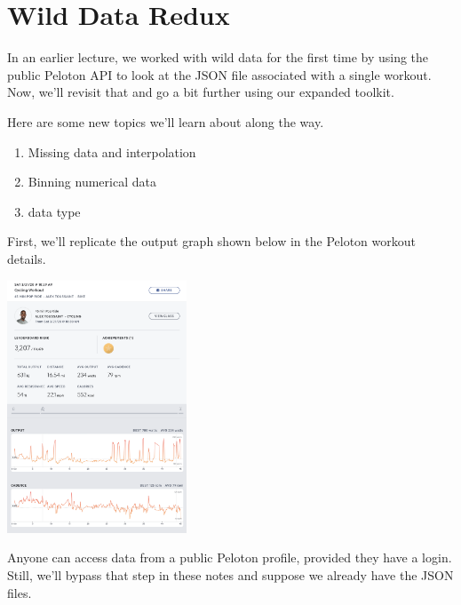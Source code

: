 \section{Wild Data Redux}

In an earlier lecture, we worked with wild data for the first time by using the public Peloton API to look at the JSON file associated with a single workout. Now, we'll revisit that and go a bit further using our expanded toolkit. 


Here are some new topics we'll learn about along the way. 

\begin{enumerate}
    \item Missing data and interpolation 
    \item Binning numerical data
    \item {} data type
\end{enumerate}


First, we'll replicate the output graph shown below in the Peloton workout details. %

\begin{center}
    \includegraphics[width = 0.4\textwidth]{images/interpolated_workout_details.png}
\end{center}

Anyone can access data from a public Peloton profile, provided they have a login. Still, we'll bypass that step in these notes and suppose we already have the JSON files. 


